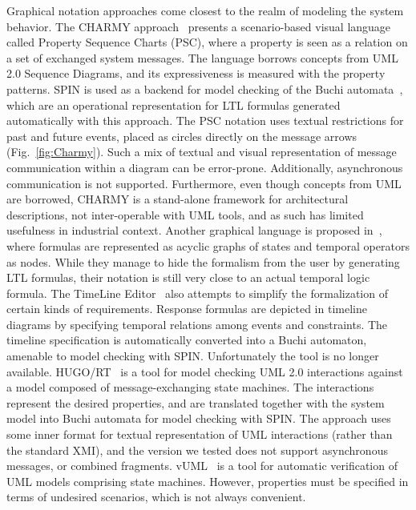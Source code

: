 \documentclass[letter]{llncs}
\begin{document}
Graphical notation approaches come closest to the realm of modeling the system behavior.
The CHARMY approach~\cite{Autili:2007:GSS:1290845.1290859} presents a scenario-based visual language called 
Property Sequence Charts (PSC), where a property is seen as a relation on a set of exchanged
system messages. The language borrows concepts from UML 2.0 Sequence Diagrams, and its expressiveness
is measured with the property patterns. SPIN is used as a backend for model checking of
the Buchi automata~\cite{Giannakopoulou:2001:AVT:872023.872506}, which are 
an operational representation for LTL formulas generated automatically with this approach.
The PSC notation uses textual restrictions for past and future events, placed as circles directly on the message arrows (Fig.~\ref{fig:Charmy}).
Such a mix of textual and visual representation of message communication
within a diagram can be error-prone. Additionally, asynchronous communication is not supported.
Furthermore, even though concepts from UML are borrowed, CHARMY is a stand-alone framework for architectural descriptions,
not inter-operable with UML tools, and as such has limited usefulness in industrial context.
Another graphical language is proposed in~\cite{Lee97agraphical}, where formulas
are represented as acyclic graphs of states and temporal operators as nodes.
While they manage to hide the formalism from the user by generating LTL formulas, 
their notation is still very close to an actual temporal logic formula.
The TimeLine Editor~\cite{Smith:2001:ECG:882477.883639} also attempts to simplify the formalization of certain
kinds of requirements. Response formulas are depicted in timeline diagrams by specifying temporal relations among events and constraints. 
The timeline specification is automatically converted into a Buchi automaton, amenable to model checking with SPIN.
Unfortunately the tool is no longer available.
HUGO/RT~\cite{Knapp:2006:MCU:1762828.1762836} is a tool for model checking UML 2.0 interactions 
against a model composed of message-exchanging state machines. The interactions represent the desired properties,
and are translated together with the system model into Buchi automata for model checking with SPIN.
The approach uses some inner format for textual representation of UML interactions (rather than
the standard XMI), and the version we tested does not support asynchronous messages, or combined fragments.
vUML~\cite{Lilius99vuml:a} is a tool for automatic verification of UML models comprising state machines.
However, properties must be specified in terms of undesired scenarios, which is not always convenient.
\end{document}
